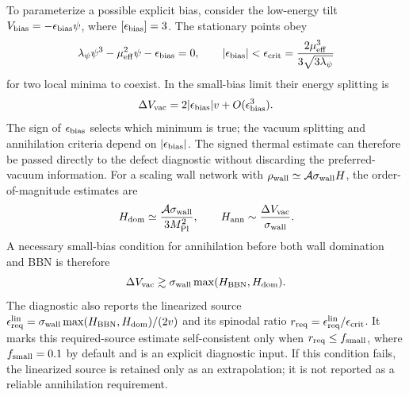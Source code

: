 \documentclass[epj]{svjour}
\begin{document}
To parameterize a possible explicit bias, consider the low-energy
tilt $V_{\rm bias}=-\epsilon_{\rm bias}\psi$, where
$[\epsilon_{\rm bias}]=3$. The stationary points obey
\begin{equation}
\lambda_\psi\psi^3-\mu_{\rm eff}^2\psi
-\epsilon_{\rm bias}=0,
\qquad
|\epsilon_{\rm bias}|<
\epsilon_{\rm crit}
=\frac{2\mu_{\rm eff}^3}
{3\sqrt{3\lambda_\psi}}
\end{equation}
for two local minima to coexist. In the small-bias limit their
energy splitting is
\begin{equation}
\Delta V_{\rm vac}
=2|\epsilon_{\rm bias}|v
+O(\epsilon_{\rm bias}^3).
\end{equation}
The sign of $\epsilon_{\rm bias}$ selects which minimum is true;
the vacuum splitting and annihilation criteria depend on
$|\epsilon_{\rm bias}|$. The signed thermal estimate can therefore be
passed directly to the defect diagnostic without discarding the
preferred-vacuum information. For a scaling wall network with
$\rho_{\rm wall}\simeq\mathcal A\sigma_{\rm wall}H$,
the order-of-magnitude estimates are
\begin{equation}
H_{\rm dom}\simeq
\frac{\mathcal A\sigma_{\rm wall}}{3M_{\rm Pl}^2},
\qquad
H_{\rm ann}\sim
\frac{\Delta V_{\rm vac}}{\sigma_{\rm wall}}.
\end{equation}
A necessary small-bias condition for annihilation before both
wall domination and BBN is therefore
\begin{equation}
\Delta V_{\rm vac}
\gtrsim\sigma_{\rm wall}
\max(H_{\rm BBN},H_{\rm dom}).
\label{eq:ptum_domain_wall_bias_bound}
\end{equation}
The diagnostic also reports the linearized source
$\epsilon_{\rm req}^{\rm lin}
=\sigma_{\rm wall}\max(H_{\rm BBN},H_{\rm dom})/(2v)$ and its
spinodal ratio
$r_{\rm req}=\epsilon_{\rm req}^{\rm lin}/\epsilon_{\rm crit}$.
It marks this required-source estimate self-consistent only when
$r_{\rm req}\le f_{\rm small}$, where $f_{\rm small}=0.1$ by default
and is an explicit diagnostic input. If this condition fails, the
linearized source is retained only as an extrapolation; it is not
reported as a reliable annihilation requirement.
\end{document}
